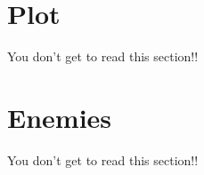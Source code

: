 \documentclass[letterpaper,12pt]{article}
\begin{document}
\section{Plot}\label{Plot}

You don't get to read this section!!

\section{Enemies}\label{Enemies}

You don't get to read this section!!
   

\end{document}
